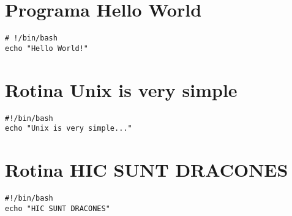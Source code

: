 \begin{apendicesenv}
\partapendices

\chapter{Programa Hello World}
\label{chap:apendiceA}

\begin{lstlisting}
# !/bin/bash
echo "Hello World!"
\end{lstlisting}

\chapter{Rotina Unix is very simple}
\label{chap:apendiceB}
\begin{lstlisting}
#!/bin/bash
echo "Unix is very simple..."
\end{lstlisting}

\chapter{Rotina HIC SUNT DRACONES}
\label{chap:apendiceC}
\begin{lstlisting}
#!/bin/bash
echo "HIC SUNT DRACONES"
\end{lstlisting}



\end{apendicesenv}
